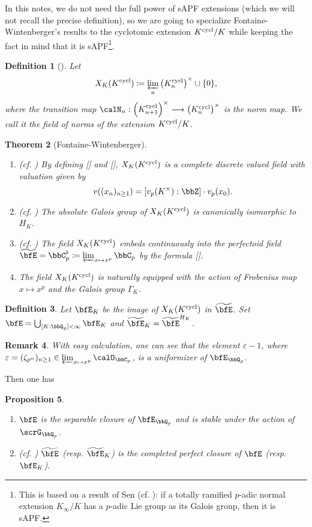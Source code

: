 \documentclass[a4paper,oneside]{amsart}
\newtheorem{theorem}{Theorem}[subsection]
\newtheorem{remark}[theorem]{Remark}
\newtheorem{proposition}[theorem]{Proposition}
\newtheorem{definition}[theorem]{Definition}
\numberwithin{equation}{section}
\numberwithin{figure}{section}
\begin{document}
In this notes, we do not need the full power of sAPF extensions (which we will not recall the precise definition), so we are going to specialize Fontaine-Wintenberger's results to the cyclotomic extension $K^{\operatorname{cycl}}/K$ while keeping the fact in mind that it is sAPF\footnote{This is based on a result of Sen (cf. \cite{sen_ramification_1972}): if a totally ramified $p$-adic normal extension $K_\infty/K$ has a $p$-adic Lie group as its Galois group, then it is sAPF.}.
\begin{definition}[{\cite[Section 2.1.1]{wintenberger_corps_1983}}]
	Let $$X_K(K^{\operatorname{cycl}})\coloneqq\varprojlim_n \left(K_n^{\operatorname{cycl}}\right)^\times\cup\{0\},$$
	where the transition map $\calN_n:\left(K_{n+1}^{\opn{cycl}}\right)^\times\lto \left(K_n^{\opn{cycl}}\right)^\times$ is the norm map. We call it the field of norms of the extension $K^{\operatorname{cycl}}/K$.
\end{definition}
\begin{theorem}[Fontaine-Wintenberger]\leavevmode
	\begin{enumerate}
		\item (cf. \cite[Th\'eor\`eme 2.1.3]{wintenberger_corps_1983}) By defining [] and [], $X_K(K^{\operatorname{cycl}})$ is a complete discrete valued field with valuation given by
		      $$v((x_n)_{n\geq 1})=[v_p(K^\times):\bbZ]\cdot v_p(x_0).$$
		\item (cf. \cite[Corollaire 3.2.3]{wintenberger_corps_1983}) The absolute Galois group of $X_K(K^{\operatorname{cycl}})$ is canonically isomorphic to $H_K$.
		\item (cf. \cite[Proposition 4.2.1]{wintenberger_corps_1983}) The field $X_K(K^{\operatorname{cycl}})$ embeds continuously into the perfectoid field $\widetilde{\bfE}=\bbC_p^\flat\coloneqq \varprojlim_{x\mapsto x^p}\bbC_p$ by the formula [].
		\item The field $X_K(K^{\operatorname{cycl}})$ is naturally equipped with the action of Frobenius map $x\mapsto x^p$ and the Galois group $\Gamma_K$.
	\end{enumerate}
\end{theorem}
\begin{definition}
	Let $\bfE_K$ be the image of $X_K(K^{\operatorname{cycl}})$ in $\widetilde{\bfE}$. Set $\bfE=\bigcup_{[K:\bbQ_p]<\infty}\bfE_K$ and $\widetilde{\bfE}_K=\widetilde{\bfE}^{H_K}$.
\end{definition}
\begin{remark}
	With easy calculation, one can see that the element $\varepsilon-1$, where $\varepsilon=(\zeta_{p^n})_{n\geq 1}\in \varprojlim_{x\mapsto x^p}\calO_{\bbC_p}$, is a uniformizer of $\bfE_{\bbQ_p}$.
\end{remark}
Then one has
\begin{proposition}\leavevmode
	\begin{enumerate}
		\item $\bfE$ is the separable closure of $\bfE_{\bbQ_p}$ and is stable under the action of $\scrG_{\bbQ_p}$.
		\item (cf. \cite[Corollaire 4.3.4]{wintenberger_corps_1983}) $\widetilde{\bfE}$ (resp. $\widetilde{\bfE}_K$) is the completed perfect closure of $\bfE$ (resp. $\bfE_K$).
	\end{enumerate}
\end{proposition}
\end{document}

